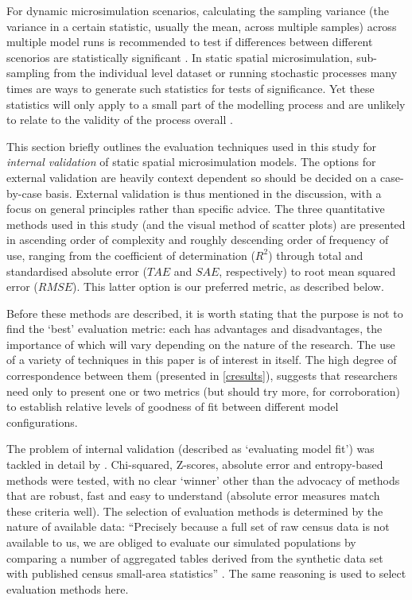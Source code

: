 \documentclass[a4paper,10pt]{article}
\begin{document}
For dynamic microsimulation scenarios,
calculating the sampling variance (the variance
in a certain statistic, usually the mean, across multiple samples)
across multiple model runs
is recommended to test if differences between different
scenorios are statistically significant \citep{goedeme2013testing}.
In static spatial
microsimulation, sub-sampling
from the individual level dataset or running stochastic processes
many times are ways to generate such statistics for tests
of significance. Yet these statistics will only apply to a small part
of the modelling process and are unlikely to relate to
the validity of the process overall \citep{Lovelace2013-trs}.

This section briefly outlines the evaluation techniques
used in this study for \emph{internal validation}
of static spatial microsimulation models.
The options for external
validation are heavily context dependent so should be decided on a
case-by-case basis.
External validation is thus mentioned in the discussion,
with a focus on general principles
rather than specific advice. The three quantitative
methods used in this study (and the visual method of scatter plots)
are presented in ascending order of complexity
and roughly descending order of frequency of use, ranging from 
the coefficient of determination ($R^2$) through total and standardised
absolute error ($TAE$ and $SAE$, respectively)
to root mean squared error ($RMSE$).
This latter option is our preferred metric, as described below.

Before these methods are described, it is
worth stating that the purpose is not to find the `best' evaluation metric:
each has advantages and disadvantages, the importance of which will vary depending on the
nature of the research. The use of a variety of techniques in this paper
is of interest in itself. The high degree of correspondence between them (presented in \cref{cresults}),
suggests that researchers need only to present one or two metrics (but should
try more, for corroboration)
to establish relative levels of goodness of fit between
different model configurations.

The problem of internal validation
(described as `evaluating model fit') was tackled in detail by \citet{Voas2001}.
Chi-squared, Z-scores, absolute error and entropy-based methods
were tested, with no clear `winner' other than the advocacy of
methods that are robust, fast and easy to understand (absolute
error measures match these criteria well).
The selection of evaluation methods is determined by
the nature of available data:
``Precisely because a full set of raw census data is not
available to us, we are obliged to evaluate our simulated populations by comparing
a number of aggregated tables derived from the synthetic data set with published
census small-area statistics'' \citep[p.~178]{Voas2001}.
The same reasoning is used to select evaluation methods here.
\end{document}
